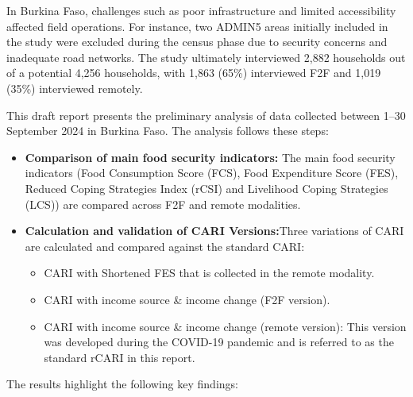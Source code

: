 \documentclass[11pt,harvard]{article}
\begin{document}
	In Burkina Faso, challenges such as poor infrastructure and limited accessibility affected field operations. For instance, two ADMIN5 areas initially included in the study were excluded during the census phase due to security concerns and inadequate road networks. The study ultimately interviewed 2,882 households out of a potential 4,256 households, with 1,863 (65\%) interviewed F2F and 1,019 (35\%) interviewed remotely.

	This draft report presents the preliminary analysis of data collected between 1–30 September 2024 in Burkina Faso. The analysis follows these steps:

	\begin{itemize}
		\item\textbf{Comparison of main food security indicators:} The main food security indicators (Food Consumption Score (FCS), Food Expenditure Score (FES), Reduced Coping Strategies Index (rCSI) and Livelihood Coping Strategies (LCS)) are compared across F2F and remote modalities.
		\item\textbf{Calculation and validation of CARI Versions:}Three variations of CARI are calculated and compared against the standard CARI:
		\begin{itemize}
			\item[1.] CARI with Shortened FES that is collected in the remote modality.
			\item[2.] CARI with income source \& income change (F2F version).
			\item[3.] CARI with income source \& income change (remote version): This version was developed during the COVID-19 pandemic and is referred to as the standard rCARI in this report.
		\end{itemize}
	\end{itemize}

		
	The results highlight the following key findings:
	 
\end{document}
